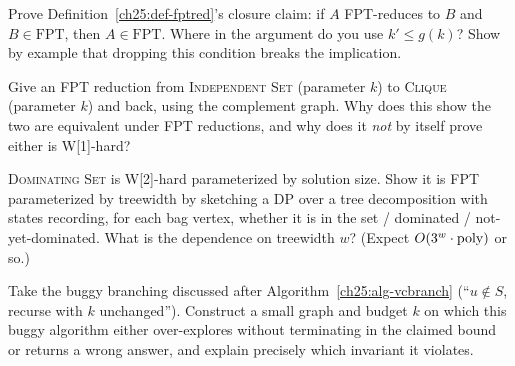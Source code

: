 \begin{exercise}
Prove Definition~\ref{ch25:def-fptred}'s closure claim: if $A$ FPT-reduces to $B$ and $B\in\mathrm{FPT}$, then $A\in\mathrm{FPT}$. Where in the argument do you use $k'\le g(k)$? Show by example that dropping this condition breaks the implication.
\end{exercise}

\begin{exercise}
Give an FPT reduction from \textsc{Independent Set} (parameter $k$) to \textsc{Clique} (parameter $k$) and back, using the complement graph. Why does this show the two are equivalent under FPT reductions, and why does it \emph{not} by itself prove either is W[1]-hard?
\end{exercise}

\begin{exercise}
\textsc{Dominating Set} is W[2]-hard parameterized by solution size. Show it is FPT parameterized by treewidth by sketching a DP over a tree decomposition with states recording, for each bag vertex, whether it is in the set / dominated / not-yet-dominated. What is the dependence on treewidth $w$? (Expect $O(3^w\cdot\operatorname{poly})$ or so.)
\end{exercise}

\begin{exercise}
Take the buggy branching discussed after Algorithm~\ref{ch25:alg-vcbranch} (``$u\notin S$, recurse with $k$ unchanged''). Construct a small graph and budget $k$ on which this buggy algorithm either over-explores without terminating in the claimed bound or returns a wrong answer, and explain precisely which invariant it violates.
\end{exercise}
